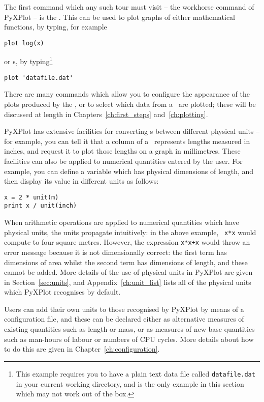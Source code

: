 The first command which any such tour must visit -- the workhorse command of
PyXPlot -- is the . This can be used to plot graphs of either
mathematical functions, by typing, for example

\begin{verbatim}
plot log(x)
\end{verbatim}

\noindent or \datafile s, by typing\footnote{This example requires you to have a
plain text data file called {\tt datafile.dat} in your current working directory,
and is the only example in this section which may not work out of the box.}

\begin{verbatim}
plot 'datafile.dat'
\end{verbatim}

\noindent There are many commands which allow you to configure the appearance
of the plots produced by the , or to select which data from a
\datafile\ are plotted; these will be discussed at length in
Chapters~\ref{ch:first_steps} and~\ref{ch:plotting}.

PyXPlot has extensive facilities for converting \datafile s between different
physical units -- for example, you can tell it that a column of a \datafile\
represents lengths measured in inches, and request it to plot those lengths on
a graph in millimetres. These facilities can also be applied to numerical
quantities entered by the user.  For example, you can define a variable which
has physical dimensions of length, and then display its value in different
units as follows:

\begin{verbatim}
x = 2 * unit(m)
print x / unit(inch)
\end{verbatim}

When arithmetic operations are applied to numerical quantities which have
physical units, the units propagate intuitively: in the above example, {\tt
x*x} would compute to four square metres. However, the expression {\tt x*x+x}
would throw an error message because it is not dimensionally correct: the first
term has dimensions of area whilst the second term has dimensions of length,
and these cannot be added.  More details of the use of physical units in
PyXPlot are given in Section~\ref{sec:units}, and Appendix~\ref{ch:unit_list}
lists all of the physical units which PyXPlot recognises by default.

Users can add their own units to those recognised by PyXPlot by means of a
configuration file, and these can be declared either as alternative measures of
existing quantities such as length or mass, or as measures of new base
quantities such as man-hours of labour or numbers of CPU cycles. More details
about how to do this are given in Chapter~\ref{ch:configuration}.

